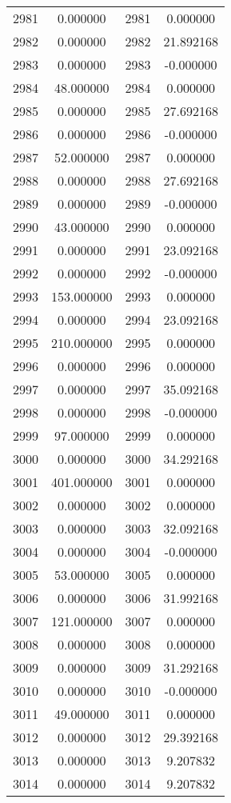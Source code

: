 \documentclass[12pt]{article}
\begin{document}
\begin{longtable}{@{}cccc@{}}
2981 & 0.000000 & 2981 & 0.000000 \\
2982 & 0.000000 & 2982 & 21.892168 \\
2983 & 0.000000 & 2983 & -0.000000 \\
2984 & 48.000000 & 2984 & 0.000000 \\
2985 & 0.000000 & 2985 & 27.692168 \\
2986 & 0.000000 & 2986 & -0.000000 \\
2987 & 52.000000 & 2987 & 0.000000 \\
2988 & 0.000000 & 2988 & 27.692168 \\
2989 & 0.000000 & 2989 & -0.000000 \\
2990 & 43.000000 & 2990 & 0.000000 \\
2991 & 0.000000 & 2991 & 23.092168 \\
2992 & 0.000000 & 2992 & -0.000000 \\
2993 & 153.000000 & 2993 & 0.000000 \\
2994 & 0.000000 & 2994 & 23.092168 \\
2995 & 210.000000 & 2995 & 0.000000 \\
2996 & 0.000000 & 2996 & 0.000000 \\
2997 & 0.000000 & 2997 & 35.092168 \\
2998 & 0.000000 & 2998 & -0.000000 \\
2999 & 97.000000 & 2999 & 0.000000 \\
3000 & 0.000000 & 3000 & 34.292168 \\
3001 & 401.000000 & 3001 & 0.000000 \\
3002 & 0.000000 & 3002 & 0.000000 \\
3003 & 0.000000 & 3003 & 32.092168 \\
3004 & 0.000000 & 3004 & -0.000000 \\
3005 & 53.000000 & 3005 & 0.000000 \\
3006 & 0.000000 & 3006 & 31.992168 \\
3007 & 121.000000 & 3007 & 0.000000 \\
3008 & 0.000000 & 3008 & 0.000000 \\
3009 & 0.000000 & 3009 & 31.292168 \\
3010 & 0.000000 & 3010 & -0.000000 \\
3011 & 49.000000 & 3011 & 0.000000 \\
3012 & 0.000000 & 3012 & 29.392168 \\
3013 & 0.000000 & 3013 & 9.207832 \\
3014 & 0.000000 & 3014 & 9.207832 \\

\end{longtable}
\end{document}
